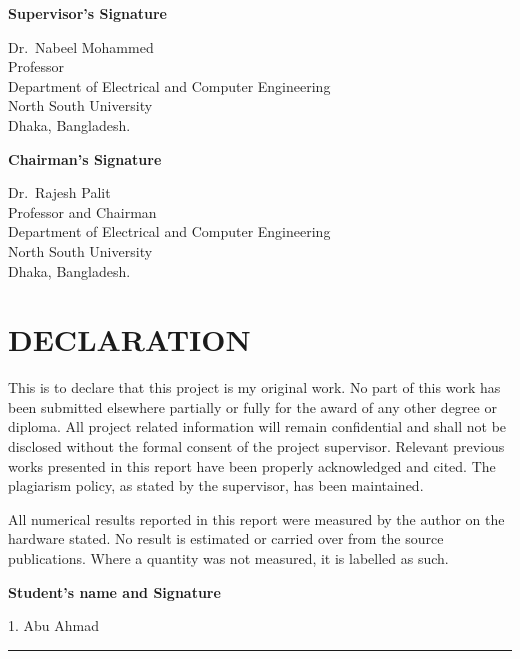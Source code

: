 \documentclass[12pt,a4paper,oneside]{report}
\begin{document}
\vspace{40pt}
\textbf{Supervisor's Signature}

\vspace{25pt}
\dotfill

Dr.\ Nabeel Mohammed\\
Professor\\
Department of Electrical and Computer Engineering\\
North South University\\
Dhaka, Bangladesh.

\vspace{35pt}
\textbf{Chairman's Signature}

\vspace{25pt}
\dotfill

Dr.\ Rajesh Palit\\
Professor and Chairman\\
Department of Electrical and Computer Engineering\\
North South University\\
Dhaka, Bangladesh.

\chapter*{DECLARATION}

This is to declare that this project is my original work. No part of this work
has been submitted elsewhere partially or fully for the award of any other
degree or diploma. All project related information will remain confidential and
shall not be disclosed without the formal consent of the project supervisor.
Relevant previous works presented in this report have been properly
acknowledged and cited. The plagiarism policy, as stated by the supervisor, has
been maintained.

All numerical results reported in this report were measured by the author on the
hardware stated. No result is estimated or carried over from the source
publications. Where a quantity was not measured, it is labelled as such.

\vspace{50pt}
\textbf{Student's name and Signature}

\vspace{35pt}
1. Abu Ahmad

\vspace{10pt}
\rule{7cm}{0.4pt}
\end{document}
